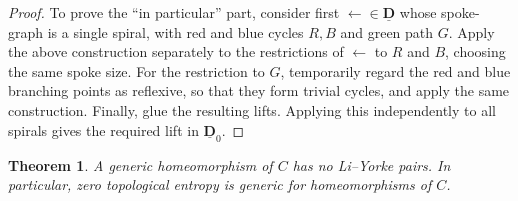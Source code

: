 \documentclass[12pt]{amsart}
\numberwithin{equation}{section}
\theoremstyle{plain}
\newtheorem{theorem}{Theorem}[section]
\theoremstyle{definition}
\newcommand \la{\leftarrow}
\newcommand \tla{\twoheadleftarrow}
\newcommand \DDub{\underline{\mathbf{D}}}
\begin{document}
\begin{proof}
To prove the ``in particular'' part, consider first $\la\in\DDub$ whose spoke-graph is a single spiral, with red and blue cycles $R,B$ and green path $G$. Apply the above construction separately to the restrictions of $\la$ to $R$ and $B$, choosing the same spoke size. For the restriction to $G$, temporarily regard the red and blue branching points as reflexive, so that they form trivial cycles, and apply the same construction. Finally, glue the resulting lifts. Applying this independently to all spirals gives the required lift in $\DDub_0$.

\end{proof} 

\begin{theorem}
A generic homeomorphism of $C$ has no Li--Yorke pairs. In particular, zero topological entropy is generic for homeomorphisms of $C$.
\end{theorem}
\end{document}
